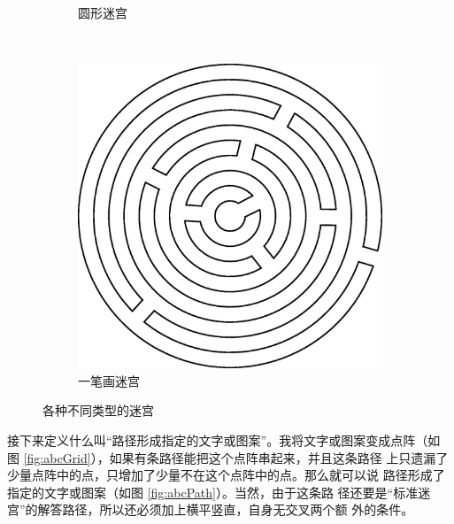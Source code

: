 \documentclass[cs4size,a4paper,adobefonts]{ctexart}
\begin{document}
\begin{figure}[htbp]
\begin{subfigure}[c]{0.31\textwidth}
    \caption{圆形迷宫}
  \end{subfigure}
  ~
  \begin{subfigure}[c]{0.31\textwidth}
    \centering
    \includegraphics[width=\textwidth]{eulerMaze}
    \caption{一笔画迷宫}
  \end{subfigure}
  \caption{各种不同类型的迷宫}\label{fig:manyMazes}
\end{figure}

接下来定义什么叫“路径形成指定的文字或图案”。我将文字或图案变成点阵（如
  图 \ref{fig:abcGrid}），如果有条路径能把这个点阵串起来，并且这条路径
上只遗漏了少量点阵中的点，只增加了少量不在这个点阵中的点。那么就可以说
路径形成了指定的文字或图案（如图 \ref{fig:abcPath}）。当然，由于这条路
径还要是“标准迷宫”的解答路径，所以还必须加上横平竖直，自身无交叉两个额
外的条件。
\end{document}
